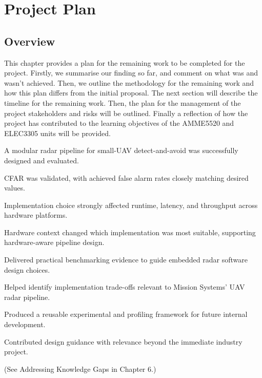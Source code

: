 \chapter{Project Plan}
\section{Overview}
This chapter provides a plan for the remaining work to be completed for the 
project. Firstly, we summarise our finding so far, and comment on what was and
wasn't achieved. Then, we outline the methodology for the remaining work and how 
this plan differs from the initial proposal. The next section will 
describe the 
timeline for the remaining work. Then, the plan for the management of 
the project stakeholders and risks will be outlined. Finally a reflection of 
how the project has contributed to the learning objectives of the AMME5520 and 
ELEC3305 units will be provided.


A modular radar pipeline for small-UAV detect-and-avoid was successfully designed 
and evaluated.

CFAR was validated, with achieved false alarm rates closely matching desired 
values.

Implementation choice strongly affected runtime, latency, and throughput across 
hardware platforms.

Hardware context changed which implementation was most suitable, supporting 
hardware-aware pipeline design.


Delivered practical benchmarking evidence to guide embedded radar software 
design choices.

Helped identify implementation trade-offs relevant to Mission Systems’ UAV radar 
pipeline.

Produced a reusable experimental and profiling framework for future internal 
development.

Contributed design guidance with relevance beyond the immediate industry project.



(See Addressing Knowledge Gaps in Chapter 6.)